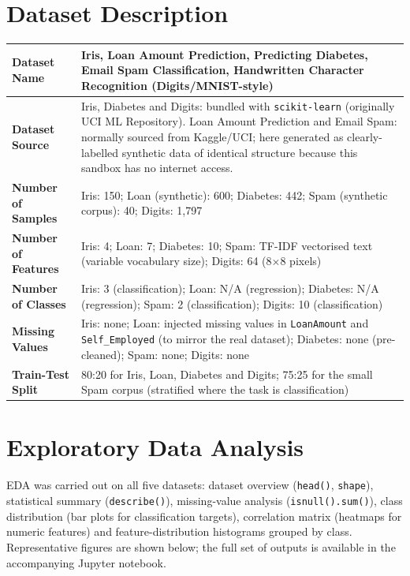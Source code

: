 \documentclass[12pt,a4paper]{article}
\begin{document}
\section{Dataset Description}
\begin{longtable}{|p{6cm}|p{8cm}|}
\hline
\textbf{Dataset Name} & Iris, Loan Amount Prediction, Predicting Diabetes, Email Spam
Classification, Handwritten Character Recognition (Digits/MNIST-style) \\ \hline
\textbf{Dataset Source} & Iris, Diabetes and Digits: bundled with \texttt{scikit-learn}
(originally UCI ML Repository). Loan Amount Prediction and Email Spam: normally sourced from
Kaggle/UCI; here generated as clearly-labelled synthetic data of identical structure because
this sandbox has no internet access. \\ \hline
\textbf{Number of Samples} & Iris: 150; Loan (synthetic): 600; Diabetes: 442; Spam (synthetic
corpus): 40; Digits: 1{,}797 \\ \hline
\textbf{Number of Features} & Iris: 4; Loan: 7; Diabetes: 10; Spam: TF-IDF vectorised text
(variable vocabulary size); Digits: 64 (8$\times$8 pixels) \\ \hline
\textbf{Number of Classes} & Iris: 3 (classification); Loan: N/A (regression); Diabetes: N/A
(regression); Spam: 2 (classification); Digits: 10 (classification) \\ \hline
\textbf{Missing Values} & Iris: none; Loan: injected missing values in \texttt{LoanAmount} and
\texttt{Self\_Employed} (to mirror the real dataset); Diabetes: none (pre-cleaned); Spam: none;
Digits: none \\ \hline
\textbf{Train-Test Split} & 80:20 for Iris, Loan, Diabetes and Digits; 75:25 for the small Spam
corpus (stratified where the task is classification) \\ \hline
\end{longtable}

\section{Exploratory Data Analysis}
EDA was carried out on all five datasets: dataset overview (\texttt{head()}, \texttt{shape}),
statistical summary (\texttt{describe()}), missing-value analysis (\texttt{isnull().sum()}),
class distribution (bar plots for classification targets), correlation matrix (heatmaps for
numeric features) and feature-distribution histograms grouped by class. Representative figures
are shown below; the full set of outputs is available in the accompanying Jupyter notebook.
\end{document}
